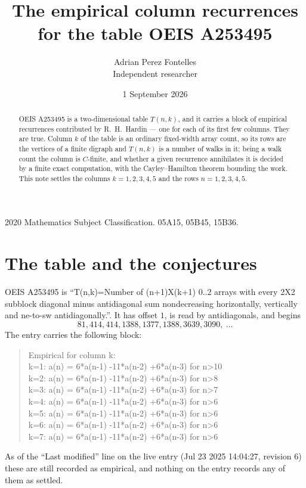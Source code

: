 \documentclass[11pt,a4paper]{article}
\title{The empirical column recurrences for the table OEIS A253495}
\author{Adrian Perez Fontelles\\ \small Independent researcher}
\date{1 September 2026}
\theoremstyle{plain}
\theoremstyle{definition}
\begin{document}
\maketitle

\begin{abstract}
OEIS A253495 is a two-dimensional table $T(n,k)$, and it carries a block of empirical
recurrences contributed by R.~H.~Hardin --- one for each of its first few columns. They are
true. Column $k$ of the table is an ordinary fixed-width array count, so its rows are the
vertices of a finite digraph and $T(n,k)$ is a number of walks in it; being a walk count the
column is $C$-finite, and whether a given recurrence annihilates it is decided by a finite
exact computation, with the Cayley--Hamilton theorem bounding the work. This note settles the columns $k=1, 2, 3, 4, 5$ and the rows $n=1, 2, 3, 4, 5$.
\end{abstract}

\noindent\small 2020 Mathematics Subject Classification. 05A15, 05B45, 15B36.\normalsize

\section{The table and the conjectures}

OEIS A253495 is ``T(n,k)=Number of (n+1)X(k+1) 0..2 arrays with every 2X2 subblock diagonal minus antidiagonal sum nondecreasing horizontally, vertically and ne-to-sw antidiagonally.''. It has offset $1$, is
read by antidiagonals, and begins
\[
81, 414, 414, 1388, 1377, 1388, 3639, 3090,\ \dots
\]
The entry carries the following block:
\begin{quote}\small
Empirical for column k:\\
k=1: a(n) = 6*a(n-1) -11*a(n-2) +6*a(n-3) for n>10\\
k=2: a(n) = 6*a(n-1) -11*a(n-2) +6*a(n-3) for n>8\\
k=3: a(n) = 6*a(n-1) -11*a(n-2) +6*a(n-3) for n>7\\
k=4: a(n) = 6*a(n-1) -11*a(n-2) +6*a(n-3) for n>6\\
k=5: a(n) = 6*a(n-1) -11*a(n-2) +6*a(n-3) for n>6\\
k=6: a(n) = 6*a(n-1) -11*a(n-2) +6*a(n-3) for n>6\\
k=7: a(n) = 6*a(n-1) -11*a(n-2) +6*a(n-3) for n>6\\
\end{quote}
As of the ``Last modified'' line on the live entry (Jul 23 2025 14:04:27, revision 6) these are still
recorded as empirical, and nothing on the entry records any of them as settled.
\end{document}
